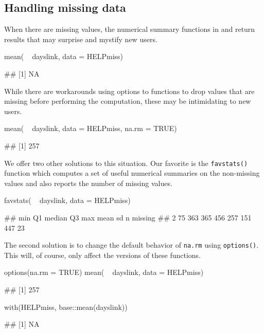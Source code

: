\subsection{Handling missing data}\label{handling-missing-data}

When there are missing values, the numerical summary functions in
 and  return results that may surprise and mystify
new users.

\begin{Schunk}
\begin{Sinput}
mean( ~ dayslink, data = HELPmiss)
\end{Sinput}
\begin{Soutput}
## [1] NA
\end{Soutput}
\end{Schunk}

\noindent
While there are workarounds using options to functions to drop values
that are missing before performing the computation, these may be
intimidating to new users.

\begin{Schunk}
\begin{Sinput}
mean( ~ dayslink, data = HELPmiss, na.rm = TRUE)
\end{Sinput}
\begin{Soutput}
## [1] 257
\end{Soutput}
\end{Schunk}

We offer two other solutions to this situation. Our favorite is the
\texttt{favstats()} function which computes a set of useful numerical
summaries on the non-missing values and also reports the number of
missing values.

\begin{Schunk}
\begin{Sinput}
favstats( ~ dayslink, data = HELPmiss)
\end{Sinput}
\begin{Soutput}
##  min Q1 median  Q3 max mean  sd   n missing
##    2 75    363 365 456  257 151 447      23
\end{Soutput}
\end{Schunk}

The second solution is to change the default behavior of \texttt{na.rm}
using \texttt{options()}. This will, of course, only affect the
 versions of these functions.

\begin{Schunk}
\begin{Sinput}
options(na.rm = TRUE)
mean( ~ dayslink, data = HELPmiss)
\end{Sinput}
\begin{Soutput}
## [1] 257
\end{Soutput}
\begin{Sinput}
with(HELPmiss, base::mean(dayslink))
\end{Sinput}
\begin{Soutput}
## [1] NA
\end{Soutput}
\end{Schunk}

